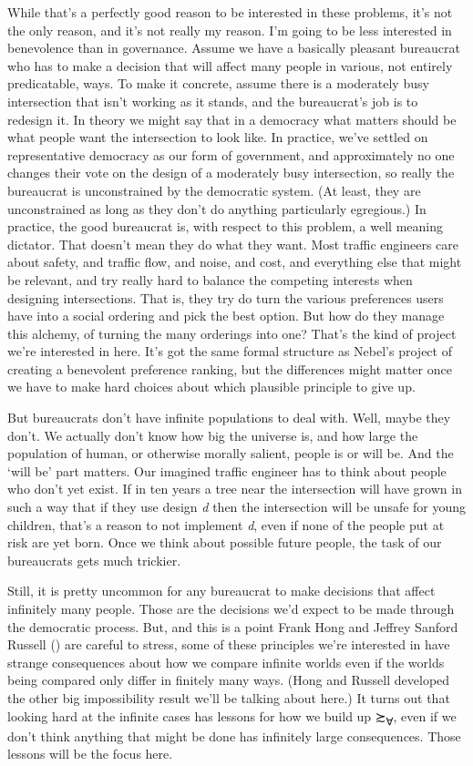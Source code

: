 \documentclass[
  11pt,
  letterpaper,
  DIV=11,
  numbers=noendperiod,
  twoside]{scrartcl}
\begin{document}
While that's a perfectly good reason to be interested in these problems,
it's not the only reason, and it's not really my reason. I'm going to be
less interested in benevolence than in governance. Assume we have a
basically pleasant bureaucrat who has to make a decision that will
affect many people in various, not entirely predicatable, ways. To make
it concrete, assume there is a moderately busy intersection that isn't
working as it stands, and the bureaucrat's job is to redesign it. In
theory we might say that in a democracy what matters should be what
people want the intersection to look like. In practice, we've settled on
representative democracy as our form of government, and approximately no
one changes their vote on the design of a moderately busy intersection,
so really the bureaucrat is unconstrained by the democratic system. (At
least, they are unconstrained as long as they don't do anything
particularly egregious.) In practice, the good bureaucrat is, with
respect to this problem, a well meaning dictator. That doesn't mean they
do what they want. Most traffic engineers care about safety, and traffic
flow, and noise, and cost, and everything else that might be relevant,
and try really hard to balance the competing interests when designing
intersections. That is, they try do turn the various preferences users
have into a social ordering and pick the best option. But how do they
manage this alchemy, of turning the many orderings into one? That's the
kind of project we're interested in here. It's got the same formal
structure as Nebel's project of creating a benevolent preference
ranking, but the differences might matter once we have to make hard
choices about which plausible principle to give up.

But bureaucrats don't have infinite populations to deal with. Well,
maybe they don't. We actually don't know how big the universe is, and
how large the population of human, or otherwise morally salient, people
is or will be. And the `will be' part matters. Our imagined traffic
engineer has to think about people who don't yet exist. If in ten years
a tree near the intersection will have grown in such a way that if they
use design \emph{d} then the intersection will be unsafe for young
children, that's a reason to not implement \emph{d}, even if none of the
people put at risk are yet born. Once we think about possible future
people, the task of our bureaucrats gets much trickier.

Still, it is pretty uncommon for any bureaucrat to make decisions that
affect infinitely many people. Those are the decisions we'd expect to be
made through the democratic process. But, and this is a point Frank Hong
and Jeffrey Sanford Russell () are
careful to stress, some of these principles we're interested in have
strange consequences about how we compare infinite worlds even if the
worlds being compared only differ in finitely many ways. (Hong and
Russell developed the other big impossibility result we'll be talking
about here.) It turns out that looking hard at the infinite cases has
lessons for how we build up ≿\textsubscript{∀}, even if we don't think
anything that might be done has infinitely large consequences. Those
lessons will be the focus here.
\end{document}

